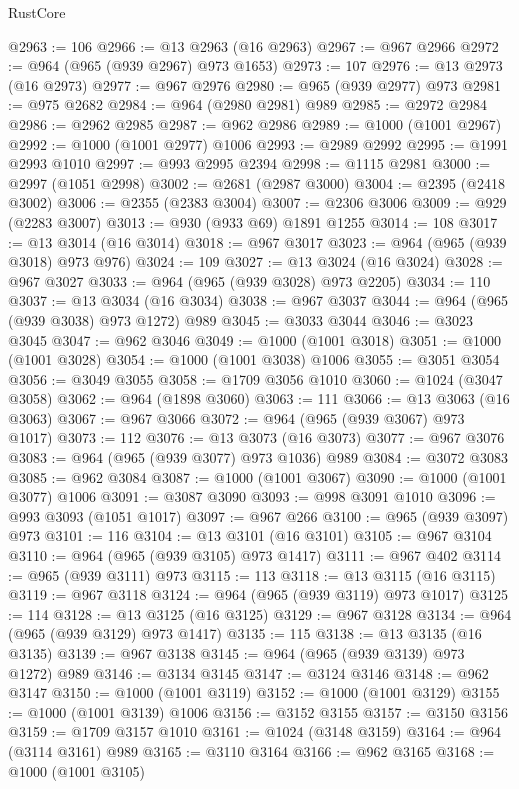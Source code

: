 \begin{lexlean}{RustCore}
\begin{coremodule}
@2963 := 106
@2966 := @13 @2963 (@16 @2963)
@2967 := @967 @2966
@2972 := @964 (@965 (@939 @2967) @973 @1653)
@2973 := 107
@2976 := @13 @2973 (@16 @2973)
@2977 := @967 @2976
@2980 := @965 (@939 @2977) @973
@2981 := @975 @2682
@2984 := @964 (@2980 @2981) @989
@2985 := @2972 @2984
@2986 := @2962 @2985
@2987 := @962 @2986
@2989 := @1000 (@1001 @2967)
@2992 := @1000 (@1001 @2977) @1006
@2993 := @2989 @2992
@2995 := @1991 @2993 @1010
@2997 := @993 @2995 @2394
@2998 := @1115 @2981
@3000 := @2997 (@1051 @2998)
@3002 := @2681 (@2987 @3000)
@3004 := @2395 (@2418 @3002)
@3006 := @2355 (@2383 @3004)
@3007 := @2306 @3006
@3009 := @929 (@2283 @3007)
@3013 := @930 (@933 @69) @1891 @1255
@3014 := 108
@3017 := @13 @3014 (@16 @3014)
@3018 := @967 @3017
@3023 := @964 (@965 (@939 @3018) @973 @976)
@3024 := 109
@3027 := @13 @3024 (@16 @3024)
@3028 := @967 @3027
@3033 := @964 (@965 (@939 @3028) @973 @2205)
@3034 := 110
@3037 := @13 @3034 (@16 @3034)
@3038 := @967 @3037
@3044 := @964 (@965 (@939 @3038) @973 @1272) @989
@3045 := @3033 @3044
@3046 := @3023 @3045
@3047 := @962 @3046
@3049 := @1000 (@1001 @3018)
@3051 := @1000 (@1001 @3028)
@3054 := @1000 (@1001 @3038) @1006
@3055 := @3051 @3054
@3056 := @3049 @3055
@3058 := @1709 @3056 @1010
@3060 := @1024 (@3047 @3058)
@3062 := @964 (@1898 @3060)
@3063 := 111
@3066 := @13 @3063 (@16 @3063)
@3067 := @967 @3066
@3072 := @964 (@965 (@939 @3067) @973 @1017)
@3073 := 112
@3076 := @13 @3073 (@16 @3073)
@3077 := @967 @3076
@3083 := @964 (@965 (@939 @3077) @973 @1036) @989
@3084 := @3072 @3083
@3085 := @962 @3084
@3087 := @1000 (@1001 @3067)
@3090 := @1000 (@1001 @3077) @1006
@3091 := @3087 @3090
@3093 := @998 @3091 @1010
@3096 := @993 @3093 (@1051 @1017)
@3097 := @967 @266
@3100 := @965 (@939 @3097) @973
@3101 := 116
@3104 := @13 @3101 (@16 @3101)
@3105 := @967 @3104
@3110 := @964 (@965 (@939 @3105) @973 @1417)
@3111 := @967 @402
@3114 := @965 (@939 @3111) @973
@3115 := 113
@3118 := @13 @3115 (@16 @3115)
@3119 := @967 @3118
@3124 := @964 (@965 (@939 @3119) @973 @1017)
@3125 := 114
@3128 := @13 @3125 (@16 @3125)
@3129 := @967 @3128
@3134 := @964 (@965 (@939 @3129) @973 @1417)
@3135 := 115
@3138 := @13 @3135 (@16 @3135)
@3139 := @967 @3138
@3145 := @964 (@965 (@939 @3139) @973 @1272) @989
@3146 := @3134 @3145
@3147 := @3124 @3146
@3148 := @962 @3147
@3150 := @1000 (@1001 @3119)
@3152 := @1000 (@1001 @3129)
@3155 := @1000 (@1001 @3139) @1006
@3156 := @3152 @3155
@3157 := @3150 @3156
@3159 := @1709 @3157 @1010
@3161 := @1024 (@3148 @3159)
@3164 := @964 (@3114 @3161) @989
@3165 := @3110 @3164
@3166 := @962 @3165
@3168 := @1000 (@1001 @3105)

\end{coremodule}
\end{lexlean}
